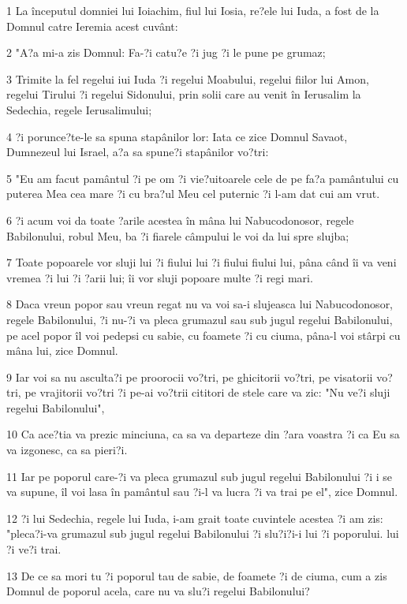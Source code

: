 \par 1 La începutul domniei lui Ioiachim, fiul lui Iosia, re?ele lui Iuda, a fost de la Domnul catre Ieremia acest cuvânt:
\par 2 "A?a mi-a zis Domnul: Fa-?i catu?e ?i jug ?i le pune pe grumaz;
\par 3 Trimite la fel regelui iui Iuda ?i regelui Moabului, regelui fiilor lui Amon, regelui Tirului ?i regelui Sidonului, prin solii care au venit în Ierusalim la Sedechia, regele Ierusalimului;
\par 4 ?i porunce?te-le sa spuna stapânilor lor: Iata ce zice Domnul Savaot, Dumnezeul lui Israel, a?a sa spune?i stapânilor vo?tri:
\par 5 "Eu am facut pamântul ?i pe om ?i vie?uitoarele cele de pe fa?a pamântului cu puterea Mea cea mare ?i cu bra?ul Meu cel puternic ?i l-am dat cui am vrut.
\par 6 ?i acum voi da toate ?arile acestea în mâna lui Nabucodonosor, regele Babilonului, robul Meu, ba ?i fiarele câmpului le voi da lui spre slujba;
\par 7 Toate popoarele vor sluji lui ?i fiului lui ?i fiului fiului lui, pâna când îi va veni vremea ?i lui ?i ?arii lui; îi vor sluji popoare multe ?i regi mari.
\par 8 Daca vreun popor sau vreun regat nu va voi sa-i slujeasca lui Nabucodonosor, regele Babilonului, ?i nu-?i va pleca grumazul sau sub jugul regelui Babilonului, pe acel popor îl voi pedepsi cu sabie, cu foamete ?i cu ciuma, pâna-l voi stârpi cu mâna lui, zice Domnul.
\par 9 Iar voi sa nu asculta?i pe proorocii vo?tri, pe ghicitorii vo?tri, pe visatorii vo?tri, pe vrajitorii vo?tri ?i pe-ai vo?trii cititori de stele care va zic: "Nu ve?i sluji regelui Babilonului",
\par 10 Ca ace?tia va prezic minciuna, ca sa va departeze din ?ara voastra ?i ca Eu sa va izgonesc, ca sa pieri?i.
\par 11 Iar pe poporul care-?i va pleca grumazul sub jugul regelui Babilonului ?i i se va supune, îl voi lasa în pamântul sau ?i-l va lucra ?i va trai pe el", zice Domnul.
\par 12 ?i lui Sedechia, regele lui Iuda, i-am grait toate cuvintele acestea ?i am zis: "pleca?i-va grumazul sub jugul regelui Babilonului ?i slu?i?i-i lui ?i poporului. lui ?i ve?i trai.
\par 13 De ce sa mori tu ?i poporul tau de sabie, de foamete ?i de ciuma, cum a zis Domnul de poporul acela, care nu va slu?i regelui Babilonului?
